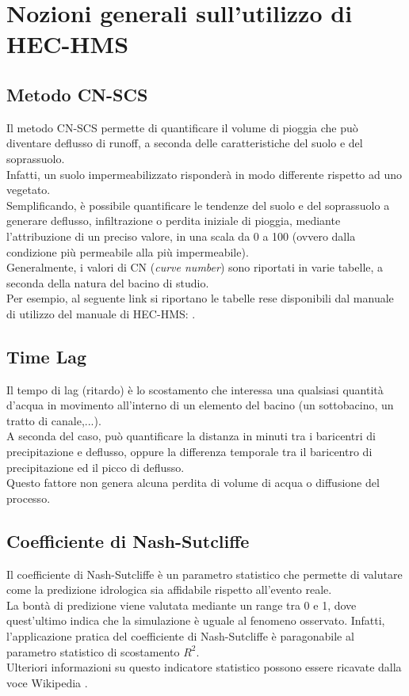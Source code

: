 \section{Nozioni generali sull'utilizzo di HEC-HMS}
\subsection{Metodo CN-SCS}
Il metodo CN-SCS permette di quantificare il volume di pioggia che può diventare deflusso di runoff, a seconda delle caratteristiche del suolo e del soprassuolo.\\
Infatti, un suolo impermeabilizzato risponderà in modo differente rispetto ad uno vegetato.\\
Semplificando, è possibile quantificare le tendenze del suolo e del soprassuolo a generare deflusso, infiltrazione o perdita iniziale di pioggia, mediante l'attribuzione di un preciso valore, in una scala da 0 a 100 (ovvero dalla condizione più permeabile alla più impermeabile).\\
Generalmente, i valori di CN (\textit{curve number}) sono riportati in varie tabelle, a seconda della natura del bacino di studio.\\
Per esempio, al seguente link si riportano le tabelle rese disponibili dal manuale di utilizzo del manuale di HEC-HMS: \cite{cn_tables_hec_hms}.

\subsection{Time Lag}
Il tempo di lag (ritardo) è lo scostamento che interessa una qualsiasi quantità d'acqua in movimento all'interno di un elemento del bacino (un sottobacino, un tratto di canale,...).\\
A seconda del caso, può quantificare la distanza in minuti tra i baricentri di precipitazione e deflusso, oppure la differenza temporale tra il baricentro di precipitazione ed il picco di deflusso.\\
Questo fattore non genera alcuna perdita di volume di acqua o diffusione del processo. 

\subsection{Coefficiente di Nash-Sutcliffe}
Il coefficiente di Nash-Sutcliffe è un parametro statistico che permette di valutare come la predizione idrologica sia affidabile rispetto all'evento reale.\\
La bontà di predizione viene valutata mediante un range tra 0 e 1, dove quest'ultimo indica che la simulazione è uguale al fenomeno osservato. Infatti, l'applicazione pratica del coefficiente di Nash-Sutcliffe è paragonabile al parametro statistico di scostamento $R^2$.\\
Ulteriori informazioni su questo indicatore statistico possono essere ricavate dalla voce Wikipedia \cite{nash-sutcliffe}.